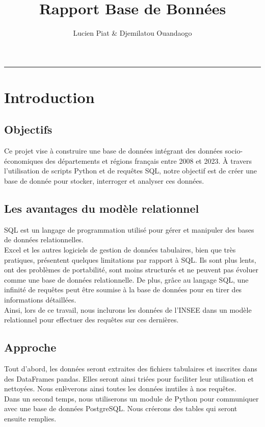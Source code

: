 \documentclass[a4paper, 11pt]{article}
\title{Rapport Base de Bonnées}
\author{Lucien Piat & Djemilatou Ouandaogo}
\begin{document}
\maketitle
\rule{8cm}{0.4pt}


\section{Introduction}
\subsection{Objectifs}
Ce projet vise à construire une base de données intégrant des données socio-économiques des départements et régions français entre 2008 et 2023. À travers l'utilisation de scripts Python et de requêtes SQL, notre objectif est de créer une base de donnée pour stocker, interroger et analyser ces données.

\subsection{Les avantages du modèle relationnel}
SQL est un langage de programmation utilisé pour gérer et manipuler des bases de données relationnelles.\\

Excel et les autres logiciels de gestion de données tabulaires, bien que très pratiques, présentent quelques limitations par rapport à SQL. Ils sont plus lents, ont des problèmes de portabilité, sont moins structurés et ne peuvent pas évoluer comme une base de données relationnelle. De plus, grâce au langage SQL, une infinité de requêtes peut être soumise à la base de données pour en tirer des informations détaillées.\\

Ainsi, lors de ce travail, nous inclurons les données de l'INSEE dans un modèle relationnel pour effectuer des requêtes sur ces dernières.\\
\subsection{Approche}
Tout d'abord, les données seront extraites des fichiers tabulaires et inscrites dans des DataFrames pandas. Elles seront ainsi triées pour faciliter leur utilisation et nettoyées. Nous enlèverons ainsi toutes les données inutiles à nos requêtes.\\

Dans un second temps, nous utiliserons un module de Python pour communiquer avec une base de données PostgreSQL. Nous créerons des tables qui seront ensuite remplies.\\
\end{document}

